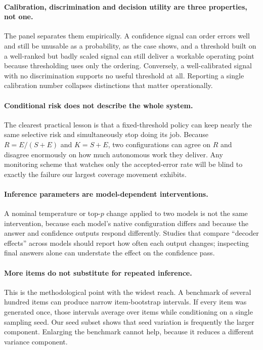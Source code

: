 \documentclass[information,article,submit,moreauthors]{Definitions/mdpi}
\begin{document}
\paragraph{Calibration, discrimination and decision utility are three
properties, not one.}
The panel separates them empirically. A confidence signal can order errors well
and still be unusable as a probability, as the \RankingCaseModel{} case shows,
and a threshold built on a well-ranked but badly scaled signal can still
deliver a workable operating point because thresholding uses only the ordering.
Conversely, a well-calibrated signal with no discrimination supports no useful
threshold at all. Reporting a single calibration number collapses distinctions
that matter operationally.

\paragraph{Conditional risk does not describe the whole system.}
The clearest practical lesson is that a fixed-threshold policy can keep nearly
the same selective risk and simultaneously stop doing its job. Because
$R = E/(S+E)$ and $K = S+E$, two configurations can agree on $R$ and disagree enormously on how
much autonomous work they deliver. Any monitoring scheme that watches only the
accepted-error rate will be blind to exactly the failure our largest coverage
movement exhibits.

\paragraph{Inference parameters are model-dependent interventions.}
A nominal temperature or top-$p$ change applied to two models is not the same
intervention, because each model's native configuration differs and because the
answer and confidence outputs respond differently. Studies that compare
``decoder effects'' across models should report how often each output changes;
inspecting final answers alone can understate the effect on the confidence pass.

\paragraph{More items do not substitute for repeated inference.}
This is the methodological point with the widest reach. A benchmark of several
hundred items can produce narrow item-bootstrap intervals. If every item was
generated once, those intervals average over items while conditioning on a
single sampling seed. Our seed subset shows that seed variation is frequently
the larger component. Enlarging the benchmark cannot help,
because it reduces a different variance component.
\end{document}
